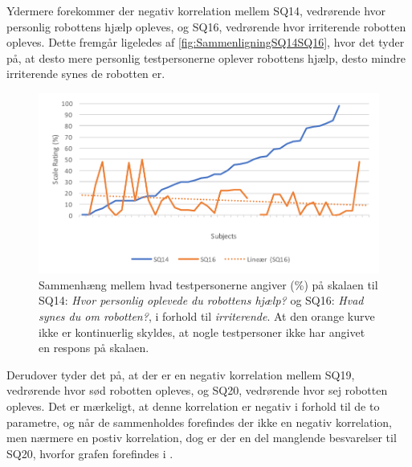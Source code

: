 Ydermere forekommer der negativ korrelation mellem SQ14, vedrørende hvor personlig robottens hjælp opleves, og SQ16, vedrørende hvor irriterende robotten opleves. Dette fremgår ligeledes af \autoref{fig:SammenligningSQ14SQ16}, hvor det tyder på, at desto mere personlig testpersonerne oplever robottens hjælp, desto mindre irriterende synes de robotten er. 
%
\begin{figure}[H]
	\centering
	\includegraphics[width=\textwidth]{Figure/Korrelationsgrafer/SQ14+SQ16}
	\caption{Sammenhæng mellem hvad testpersonerne angiver (\%) på skalaen til SQ14: \textit{Hvor personlig oplevede du robottens hjælp?} og SQ16: \textit{Hvad synes du om robotten?}, i forhold til \textit{irriterende}. At den orange kurve ikke er kontinuerlig skyldes, at nogle testpersoner ikke har angivet en respons på skalaen.}
	\label{fig:SammenligningSQ14SQ16}
\end{figure}
\noindent
%
Derudover tyder det på, at der er en negativ korrelation mellem SQ19, vedrørende hvor sød robotten opleves, og SQ20, vedrørende hvor sej robotten opleves. Det er mærkeligt, at denne korrelation er negativ i forhold til de to parametre, og når de sammenholdes forefindes der ikke en negativ korrelation, men nærmere en postiv korrelation, dog er der en del manglende besvarelser til SQ20, hvorfor grafen forefindes i .
%
